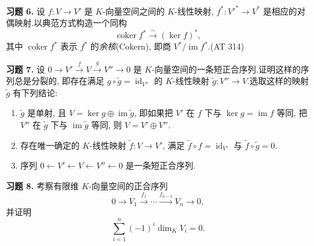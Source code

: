 \noindent\textbf{习题 6.} 设 $f \colon V \longrightarrow V'$ 是 $K$-向量空间之间的 $K$-线性映射, $f^* \colon V'^* \longrightarrow V^*$ 是相应的对偶映射.以典范方式构造一个同构
\[
\operatorname{coker} f^* \overset{\sim}{\longrightarrow} (\ker f)^*,
\]
其中 $\operatorname{coker} f^*$ 表示 $f^*$ 的\emph{余核}(\textup{Cokern}), 即商 $V^*/\operatorname{im} f^*$.(AT 314)

\noindent\textbf{习题 7.} 设 $0 \longrightarrow V' \xrightarrow{f} V \xrightarrow{g} V'' \longrightarrow 0$ 是 $K$-向量空间的一条短正合序列.证明这样的序列总是分裂的, 即存在满足 $g \circ \tilde{g} = \operatorname{id}_{V''}$ 的 $K$-线性映射 $\tilde{g} \colon V'' \longrightarrow V$.选取这样的映射 $\tilde{g}$ 有下列结论:
\begin{enumerate}
\item[(i)] $\tilde{g}$ 是单射, 且 $V = \ker g \oplus \operatorname{im}\tilde{g}$, 即如果把 $V'$ 在 $f$ 下与 $\ker g = \operatorname{im} f$ 等同, 把 $V''$ 在 $\tilde{g}$ 下与 $\operatorname{im}\tilde{g}$ 等同, 则 $V = V' \oplus V''$.
\item[(ii)] 存在唯一确定的 $K$-线性映射 $\tilde{f} \colon V \longrightarrow V'$, 满足 $\tilde{f} \circ f = \operatorname{id}_{V'}$ 与 $\tilde{f} \circ \tilde{g} = 0$.
\item[(iii)] 序列 $0 \longleftarrow V' \longleftarrow V \longleftarrow V'' \longleftarrow 0$ 是一条短正合序列.
\end{enumerate}

\noindent\textbf{习题 8.} 考察有限维 $K$-向量空间的正合序列
\[
0 \longrightarrow V_1 \xrightarrow{f_1} \cdots \xrightarrow{f_{n-1}} V_n \longrightarrow 0,
\]
并证明
\[
\sum_{i = 1}^{n} (-1)^i \dim_K V_i = 0\text{.}
\]

